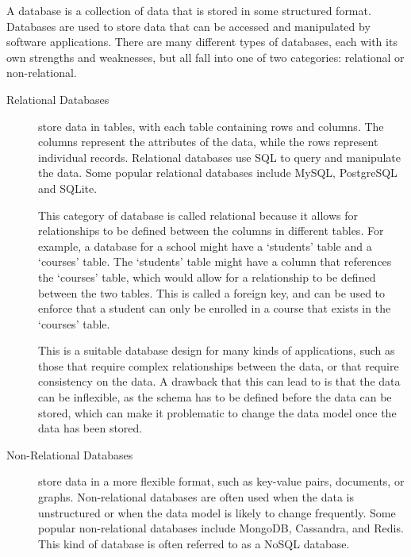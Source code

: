 \documentclass[11pt, a4paper,twoside]{report}
\theoremstyle{plain} %
\theoremstyle{definition} %
\numberwithin{equation}{chapter}
\begin{document}
A database is a collection of data that is stored in some structured
format. Databases are used to store data that can be accessed and
manipulated by software applications. There are many different types of
databases, each with its own strengths and weaknesses, but all fall into
one of two categories: relational or non-relational.

\begin{description}

    \item[Relational Databases\cite{relational-databases}] {
        store data in tables, with each table containing rows and columns. The
        columns represent the attributes of the data, while the rows represent
        individual records. Relational databases use SQL to query and
        manipulate the data. Some popular relational databases include MySQL,
        PostgreSQL and SQLite.

        This category of database is called relational because it allows for
        relationships to be defined between the columns in different tables.
        For example, a database for a school might have a `students' table and
        a `courses' table. The `students' table might have a column that
        references the `courses' table, which would allow for a relationship
        to be defined between the two tables. This is called a foreign key, and
        can be used to enforce that a student can only be enrolled in a course
        that exists in the `courses' table.

        This is a suitable database design for many kinds of applications, such
        as those that require complex relationships between the data, or that
        require consistency on the data. A drawback that this can lead to is
        that the data can be inflexible, as the schema has to be defined before
        the data can be stored, which can make it problematic to change the
        data model once the data has been stored.
        }

    \item[Non-Relational Databases\cite{nosql-databases}] {
        store data in a more flexible format, such as key-value pairs,
        documents, or graphs. Non-relational databases are often used when the
        data is unstructured or when the data model is likely to change
        frequently. Some popular non-relational databases include MongoDB,
        Cassandra, and Redis. This kind of database is often referred to as a
        NoSQL database.

}
\end{description}
\end{document}
